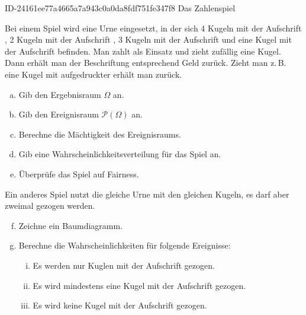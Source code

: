 \begin{exercise}
      {ID-24161ee77a4665a7a943c0a0da8fdf751fe347f8}
      {Das Zahlenspiel}
  \ifproblem\problem\par
    Bei einem Spiel wird eine Urne eingesetzt, in der
    sich 4 Kugeln mit der Aufschrift \grqq,
    2 Kugeln mit der Aufschrift \grqq, 3 Kugeln
    mit der Aufschrift \grqq{} und eine Kugel
    mit der Aufschrift \grqq{} befinden.
    Man zahlt  als Einsatz und zieht zufällig
    eine Kugel. Dann erhält man der Beschriftung
    entsprechend Geld zurück. Zieht man z.\,B. eine
    Kugel mit aufgedruckter \grqq{} erhält man
     zurück.
    \begin{enumerate}[a)]
      \item Gib den Ergebnisraum $\Omega$ an.
      \item Gib den Ereignisraum $\mathcal{P}(\Omega)$ an.
      \item Berechne die Mächtigkeit des Ereignisraums.
      \item Gib eine Wahrscheinlichkeitsverteilung für
            das Spiel an.
      \item Überprüfe das Spiel auf Fairness.
    \end{enumerate}
    Ein anderes Spiel nutzt die gleiche Urne mit den
    gleichen Kugeln, es darf aber zweimal gezogen werden.
    \begin{enumerate}[a)]
      \setcounter{enumi}{5}
      \item Zeichne ein Baumdiagramm.
      \item Berechne die Wahrscheinlichkeiten für folgende
            Ereignisse:
            \begin{enumerate}[i.]
              \item Es werden nur Kuglen mit der Aufschrift
                    \grqq{} gezogen.
              \item Es wird mindestens eine Kugel mit
                    der Aufschrift \grqq{}
                    gezogen.
              \item Es wird keine Kugel mit der
                    Aufschrift \grqq{}
                    gezogen.
            \end{enumerate}
    \end{enumerate}
  \fi
\end{exercise}

